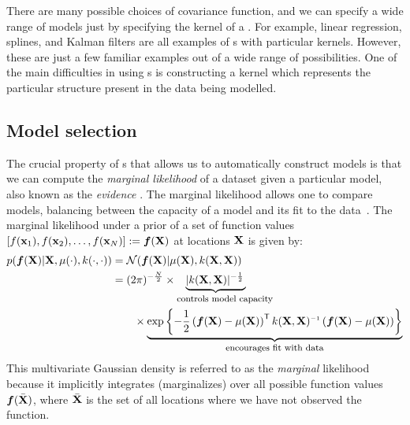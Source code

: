 There are many possible choices of covariance function, and we can specify a wide range of models just by specifying the kernel of a \gp{}.
For example, linear regression, splines, and Kalman filters are all examples of \gp{}s with particular kernels.
However, these are just a few familiar examples out of a wide range of possibilities. %
One of the main difficulties in using \gp{}s is constructing a kernel which represents the particular structure present in the data being modelled.


\subsection{Model selection}

The crucial property of \gp{}s that allows us to automatically construct models is that we can compute the \emph{marginal likelihood} of a dataset given a particular model, also known as the \emph{evidence} \citep{mackay1992bayesian}.
The marginal likelihood allows one to compare models, balancing between the capacity of a model and its fit to the data~\citep{rasmussen2001occam,mackay2003information}.
%
%
The marginal likelihood under a \gp{} prior of a set of function values $\left[ f({\bf{x}}_1), f({\bf{x}}_2), \ldots, f({\bf{x}}_N)  \right] \mathrel{:\mkern-0.25mu=} \boldsymbol{f}(\mathbf{X})$ at locations $\mathbf{X}$ is given by:
%
\begin{align}
p(\funcval | \vX, \mu(\cdot), k(\cdot, \cdot)) & = \N{\funcval}{\mu(\vX)}{k(\vX, \vX)} \label{eq:gp_marg_lik} \\
& = (2\pi)^{-\frac{N}{2}} \times \underwrite{ |k(\vX, \vX)|^{-\frac{1}{2}}\,}{\parbox{2.5cm}{\parbox{4cm}{\footnotesize controls model capacity}}} \nonumber \\
 & \qquad \times \underwrite{\exp \left\{ -\frac{1}{2} \left( \funcval - \mu(\vX) \right)\tra k(\vX, \vX)\inv \left(\funcval - \mu(\vX) \right) \right\}}{\footnotesize encourages fit with data} \nonumber
\end{align}
%
This multivariate Gaussian density is referred to as the \emph{marginal} likelihood because it implicitly integrates (marginalizes) over all possible function values $\boldsymbol{f}( \bar {\mathbf{X}})$, where $\bar {\mathbf{X}}$ is the set of all locations where we have not observed the function.

